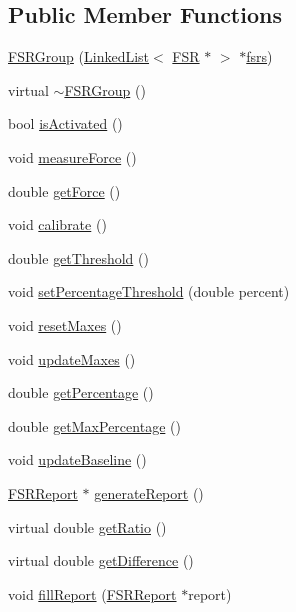 \subsection*{Public Member Functions}
\begin{DoxyCompactItemize}
\item 
\hyperlink{classFSRGroup_a14f2398406fea72cc9c42fe38a5209df}{F\+S\+R\+Group} (\hyperlink{classLinkedList}{Linked\+List}$<$ \hyperlink{classFSR}{F\+SR} $\ast$ $>$ $\ast$\hyperlink{classFSRGroup_a818ff1c99f2f1aaa5bd36c6cb701b491}{fsrs})
\item 
virtual \hyperlink{classFSRGroup_ace5505a55102264e6bba241f41ab4836}{$\sim$\+F\+S\+R\+Group} ()
\item 
bool \hyperlink{classFSRGroup_a6f60094985663d5a19c42b1f402d42e8}{is\+Activated} ()
\item 
void \hyperlink{classFSRGroup_a3af851fc34ba3aa756345a6c2cc488c4}{measure\+Force} ()
\item 
double \hyperlink{classFSRGroup_a69a95934d542076c08e049e3b0312994}{get\+Force} ()
\item 
void \hyperlink{classFSRGroup_a58d86b5460cecb3c006aecfda1dc43ec}{calibrate} ()
\item 
double \hyperlink{classFSRGroup_ab8266f4e3ef2bf17a71e59069ff35754}{get\+Threshold} ()
\item 
void \hyperlink{classFSRGroup_a9d9e243ad7f7368493c7cf6bf045e54b}{set\+Percentage\+Threshold} (double percent)
\item 
void \hyperlink{classFSRGroup_afb080b398697513ea57374be3c14bc6e}{reset\+Maxes} ()
\item 
void \hyperlink{classFSRGroup_a8c308ccc00dfe0e999c1e3deb06755be}{update\+Maxes} ()
\item 
double \hyperlink{classFSRGroup_a261c1a4bf8fd1ebd9237ec9d1b1b261f}{get\+Percentage} ()
\item 
double \hyperlink{classFSRGroup_a095df087d7140fdaa1240150a3b8acda}{get\+Max\+Percentage} ()
\item 
void \hyperlink{classFSRGroup_a8896f4f0b2b8b150a1ccff0ee303248a}{update\+Baseline} ()
\item 
\hyperlink{classFSRReport}{F\+S\+R\+Report} $\ast$ \hyperlink{classFSRGroup_a791432248f8a588adc292c0eb9e19c38}{generate\+Report} ()
\item 
virtual double \hyperlink{classFSRGroup_ae1658e0276de8cf7d9a3c29c84257d3b}{get\+Ratio} ()
\item 
virtual double \hyperlink{classFSRGroup_ab12866c42645b5d892a1d69fb7056e4f}{get\+Difference} ()
\item 
void \hyperlink{classFSRGroup_a5a59a5ddf09a579d693e1c3687fbff46}{fill\+Report} (\hyperlink{classFSRReport}{F\+S\+R\+Report} $\ast$report)
\end{DoxyCompactItemize}
